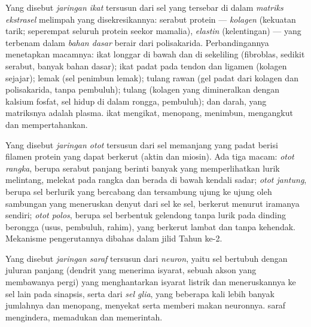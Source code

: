 \begin{definition}\label{def:b1:body-plans-tissues:connective}
Yang disebut \emph{jaringan ikat} tersusun dari sel
yang tersebar di dalam \emph{matriks ekstrasel}
melimpah yang disekresikannya: serabut protein ---
\emph{kolagen} (kekuatan tarik; seperempat seluruh
protein seekor mamalia), \emph{elastin} (kelentingan) ---
yang terbenam dalam \emph{bahan dasar} berair dari polisakarida.
Perbandingannya menetapkan macamnya:  ikat longgar di bawah
 dan di sekeliling  (fibroblas, sedikit serabut, banyak bahan
dasar);  ikat padat pada tendon dan ligamen (kolagen sejajar);
 lemak (sel penimbun lemak); tulang rawan (gel padat dari
kolagen dan polisakarida, tanpa pembuluh); tulang (kolagen yang
dimineralkan dengan kalsium fosfat, sel hidup di dalam rongga,
pembuluh); dan darah, yang matriksnya adalah plasma.  ikat
mengikat, menopang, menimbun, mengangkut dan mempertahankan.
\end{definition}

\begin{definition}\label{def:b1:body-plans-tissues:muscle}
Yang disebut \emph{jaringan otot} tersusun dari sel
memanjang yang padat berisi filamen protein yang dapat berkerut (aktin
dan miosin). Ada tiga macam: \emph{otot rangka}, berupa serabut panjang
berinti banyak yang memperlihatkan lurik melintang, melekat pada rangka
dan berada di bawah kendali sadar; \emph{otot jantung}, berupa sel
berlurik yang bercabang dan tersambung ujung ke ujung oleh sambungan
yang meneruskan denyut dari sel ke sel, berkerut menurut iramanya
sendiri; \emph{otot polos}, berupa sel berbentuk gelendong tanpa lurik
pada dinding  berongga (usus, pembuluh, rahim), yang berkerut
lambat dan tanpa kehendak. Mekanisme pengerutannya dibahas dalam jilid
Tahun ke-2.
\end{definition}

\begin{definition}\label{def:b1:body-plans-tissues:nervous}
Yang disebut \emph{jaringan saraf} tersusun dari
\emph{neuron}, yaitu sel bertubuh dengan juluran panjang
(dendrit yang menerima isyarat, sebuah akson yang membawanya pergi) yang
menghantarkan isyarat listrik dan meneruskannya ke sel lain pada
sinapsis, serta dari \emph{sel glia}, yang beberapa kali
lebih banyak jumlahnya dan menopang, menyekat serta memberi makan
neuronnya.  saraf mengindera, memadukan dan memerintah.
\end{definition}

